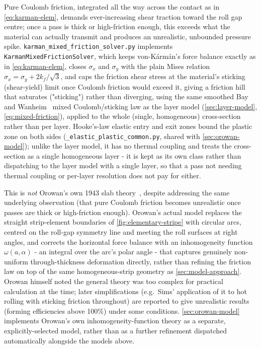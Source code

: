 \documentclass[11pt]{PyRollDocs}
\begin{document}
    Pure Coulomb friction, integrated all the way across the contact as in \autoref{eq:karman-elem}, demands ever-increasing shear traction toward the roll gap centre; once a pass is thick or high-friction enough, this exceeds what the material can actually transmit and produces an unrealistic, unbounded pressure spike. \lstinline{karman_mixed_friction_solver.py} implements \lstinline{KarmanMixedFrictionSolver}, which keeps von-Kármán's force balance exactly as in \autoref{eq:karman-elem}, closes $\sigma_x$ and $\sigma_y$ with the plain Mises relation $\sigma_x = \sigma_y + 2k_f/\sqrt3$, and caps the friction shear stress at the material's sticking (shear-yield) limit once Coulomb friction would exceed it, giving a friction hill that saturates ("sticking") rather than diverging, using the same smoothed Bay and Wanheim~\cite{BayWanheim1976} mixed Coulomb/sticking law as the layer model (\autoref{sec:layer-model}, \autoref{eq:mixed-friction}), applied to the whole (single, homogeneous) cross-section rather than per layer. Hooke's-law elastic entry and exit zones bound the plastic zone on both sides (\lstinline{_elastic_plastic_common.py}, shared with \autoref{sec:orowan-model}); unlike the layer model, it has no thermal coupling and treats the cross-section as a single homogeneous layer - it is kept as its own class rather than dispatching to the layer model with a single layer, so that a pass not needing thermal coupling or per-layer resolution does not pay for either.

    This is \emph{not} Orowan's own 1943 slab theory~\cite{Orowan1943}, despite addressing the same underlying observation (that pure Coulomb friction becomes unrealistic once passes are thick or high-friction enough). Orowan's actual model replaces the straight strip-element boundaries of \autoref{fig:elementary-stripe} with circular arcs, centred on the roll-gap symmetry line and meeting the roll surfaces at right angles, and corrects the horizontal force balance with an inhomogeneity function $\omega(a,\alpha)$ - an integral over the arc's polar angle - that captures genuinely non-uniform through-thickness deformation directly, rather than refining the friction law on top of the same homogeneous-strip geometry as \autoref{sec:model-approach}. Orowan himself noted the general theory was too complex for practical calculation at the time; later simplifications (e.g.\ Sims' application of it to hot rolling with sticking friction throughout) are reported to give unrealistic results (forming efficiencies above 100\%) under some conditions. \autoref{sec:orowan-model} implements Orowan's own inhomogeneity-function theory as a separate, explicitly-selected model, rather than as a further refinement dispatched automatically alongside the models above.
\end{document}
